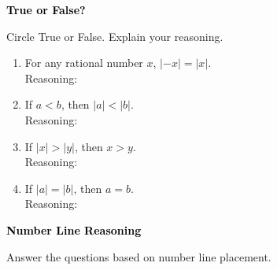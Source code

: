 \documentclass[12pt, letterpaper, fleqn]{article}
\begin{document}
\newpage

\begin{tcolorbox}[colback=black!10]
\large\textcolor{black}{\textbf{True or False?}}
\end{tcolorbox}

\noindent
Circle True or False. Explain your reasoning.

\vspace{3mm}

\begin{enumerate}[itemsep=1.5cm, leftmargin=0.6cm]
\item For any rational number $x$, $|-x| = |x|$. \quad {} \quad {} \\
Reasoning: 
\vspace{2cm}
\item If $a < b$, then $|a| < |b|$. \quad \quad {} \quad {} \\
Reasoning: 
\vspace{2cm}
\item If $|x| > |y|$, then $x > y$. \quad \quad {} \quad {} \\
Reasoning: 
\vspace{2cm}
\item If $|a| = |b|$, then $a = b$. \quad \quad {} \quad {} \\
Reasoning: 
\vspace{2cm}
\end{enumerate}

\newpage

\begin{tcolorbox}[colback=black!10]
\large\textcolor{black}{\textbf{Number Line Reasoning}}
\end{tcolorbox}

\noindent
Answer the questions based on number line placement.

\vspace{3mm}
\end{document}
